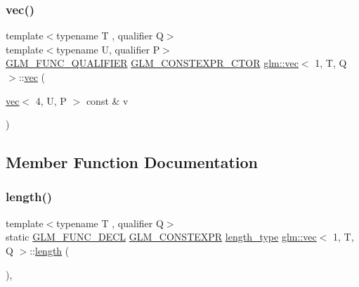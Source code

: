 \mbox{\label{structglm_1_1vec_3_011_00_01_t_00_01_q_01_4_a488f936163dd6df03df27373e8337869}} 
\subsubsection{\texorpdfstring{vec()}{vec()}\hspace{0.1cm}{\footnotesize\ttfamily [14/14]}}
{\footnotesize\ttfamily template$<$typename T , qualifier Q$>$ \\
template$<$typename U, qualifier P$>$ \\
\mbox{\hyperlink{setup_8hpp_a33fdea6f91c5f834105f7415e2a64407}{G\+L\+M\+\_\+\+F\+U\+N\+C\+\_\+\+Q\+U\+A\+L\+I\+F\+I\+ER}} \mbox{\hyperlink{setup_8hpp_ad34178a09666081abdb573c14d1f4a5a}{G\+L\+M\+\_\+\+C\+O\+N\+S\+T\+E\+X\+P\+R\+\_\+\+C\+T\+OR}} \mbox{\hyperlink{structglm_1_1vec}{glm\+::vec}}$<$ 1, T, Q $>$\+::\mbox{\hyperlink{structglm_1_1vec}{vec}} (\begin{DoxyParamCaption}\item[{\mbox{\hyperlink{structglm_1_1vec}{vec}}$<$ 4, U, P $>$ const \&}]{v }\end{DoxyParamCaption})}



\subsection{Member Function Documentation}
\mbox{\label{structglm_1_1vec_3_011_00_01_t_00_01_q_01_4_a225b4ffa0391c3f0c64d1b43cf7a662d}} 
\subsubsection{\texorpdfstring{length()}{length()}}
{\footnotesize\ttfamily template$<$typename T , qualifier Q$>$ \\
static \mbox{\hyperlink{setup_8hpp_ab2d052de21a70539923e9bcbf6e83a51}{G\+L\+M\+\_\+\+F\+U\+N\+C\+\_\+\+D\+E\+CL}} \mbox{\hyperlink{setup_8hpp_a08b807947b47031d3a511f03f89645ad}{G\+L\+M\+\_\+\+C\+O\+N\+S\+T\+E\+X\+PR}} \mbox{\hyperlink{structglm_1_1vec_3_011_00_01_t_00_01_q_01_4_a37415eee3b59cf93cdb752a2b30fe5e6}{length\+\_\+type}} \mbox{\hyperlink{structglm_1_1vec}{glm\+::vec}}$<$ 1, T, Q $>$\+::\mbox{\hyperlink{_s_d_l__opengl__glext_8h_ab9c919755bde3b34349e23a32b4e0fa7}{length}} (\begin{DoxyParamCaption}{ }\end{DoxyParamCaption})\hspace{0.3cm}{\ttfamily [inline]}, {\ttfamily [static]}}

